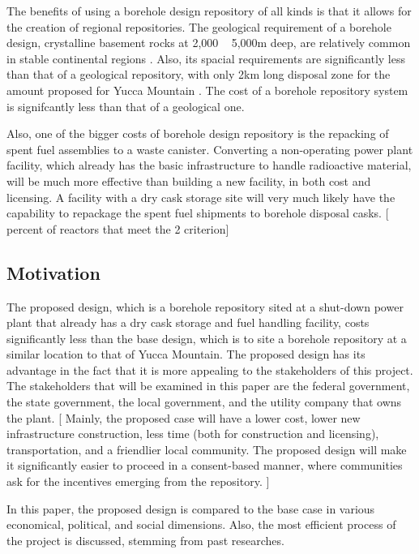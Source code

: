 \documentclass{anstrans}
\begin{document}
The benefits of using a borehole design repository of all kinds is that it 
allows for the creation of regional repositories. The geological requirement of 
a borehole design, crystalline basement rocks at 2,000 ~ 5,000m deep, are 
relatively common in stable continental regions \cite{arnold_research_2012}.  
Also, its spacial requirements are significantly less than that of a geological 
repository, with only 2km long disposal zone for the amount proposed for Yucca 
Mountain \cite{brady_deep_2009}. The cost of a borehole repository system is signifcantly less than that of a geological one. 

Also, one of the bigger costs of borehole design repository is the repacking of 
spent fuel assemblies to a waste canister. Converting a non-operating power 
plant facility, which already has the basic infrastructure to handle 
radioactive material, will be much more effective than building a new facility, 
in both cost and licensing. A facility with a dry cask storage site will very much likely have the capability to repackage the spent fuel shipments to borehole disposal casks. [ percent of reactors that meet the 2 criterion]

\subsection{Motivation}

The proposed design, which is a borehole repository sited at a shut-down power plant that already has a dry cask storage and fuel handling facility, costs significantly less than the base design, which is to site a borehole repository at a similar location to that of Yucca Mountain. The proposed design has its advantage in the fact that it is more appealing to the stakeholders of this project. The stakeholders that will be examined in this paper are the federal government, the state government, the local government, and the utility company that owns the plant.
[ Mainly, the proposed case will have a lower cost, lower new infrastructure construction, less time (both for construction and licensing), transportation, and a friendlier local community. The proposed design will make it significantly easier to proceed in a consent-based manner, where communities ask for the incentives emerging from the repository. ] 

In this paper, the proposed design is compared to the base case in various economical, political, and social dimensions. Also, the most efficient process of the project is discussed, stemming from past researches. 
\end{document}
